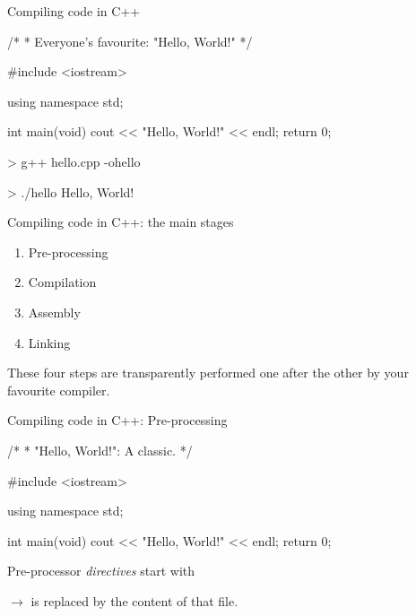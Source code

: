 \documentclass[compress]{beamer}
\begin{document}
\begin{frame}[fragile]{Compiling code in C++}

\begin{cppcode}
/*
 * Everyone's favourite: "Hello, World!"
 */

#include <iostream>

using namespace std;

int main(void)
{
    cout << "Hello, World!" << endl;
    return 0;
}
\end{cppcode}

\pause

\begin{shcode}
> g++ hello.cpp -ohello
\end{shcode}

\pause 

\begin{shcode}
> ./hello
Hello, World!
\end{shcode}

\end{frame}


\begin{frame}{Compiling code in C++: the main stages}

    \begin{enumerate}
        \item Pre-processing
        \item Compilation
        \item Assembly
        \item Linking
    \end{enumerate}

These four steps are transparently performed one after the other by your
    favourite compiler.

\end{frame}

\begin{frame}[fragile]{Compiling code in C++: Pre-processing}


\begin{cppcode}
/*
 * "Hello, World!": A classic.
 */

#include <iostream>

using namespace std;

int main(void)
{
    cout << "Hello, World!" << endl;
    return 0;
}
\end{cppcode}

Pre-processor \emph{directives} start with \cpp{#}

$\rightarrow$  is replaced by the content of that file.

\end{frame}
\end{document}
